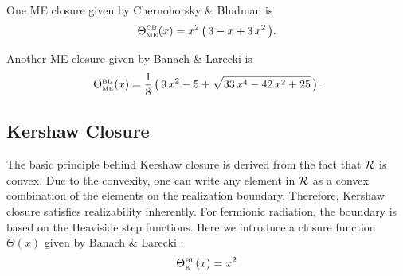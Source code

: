 One ME closure given by Chernohorsky \& Bludman \cite{cernohorskyBludman_1994} is
\begin{equation}
  \Theta_{\mbox{\tiny ME}}^{\mbox{\tiny CB}}(x)
  =x^{2}\,\big(\,3-x+3\,x^{2}\,\big).
\end{equation}

Another ME closure given by Banach \& Larecki \cite{banachLarecki_2017b} is
\begin{equation}
  \Theta_{\mbox{\tiny ME}}^{\mbox{\tiny BL}}(x)
  =\frac{1}{8}\,\big(\,9\,x^{2}-5+\sqrt{33\,x^{4}-42\,x^{2}+25}\,\big).
\end{equation}

\subsection{Kershaw Closure}
The basic principle behind Kershaw closure is derived from the fact that $\mathcal{R}$ is convex.
Due to the convexity, one can write any element in $\mathcal{R}$ as a convex combination of the elements on the realization boundary. 
Therefore, Kershaw closure satisfies realizability inherently.
For fermionic radiation, the boundary is based on the Heaviside step functions.
Here we introduce a closure function $\Theta(x)$ given by Banach \& Larecki \cite{banachLarecki_2017a}:
\begin{equation}
  \Theta_{\mbox{\tiny K}}^{\mbox{\tiny BL}}(x)=x^{2}
\end{equation}

